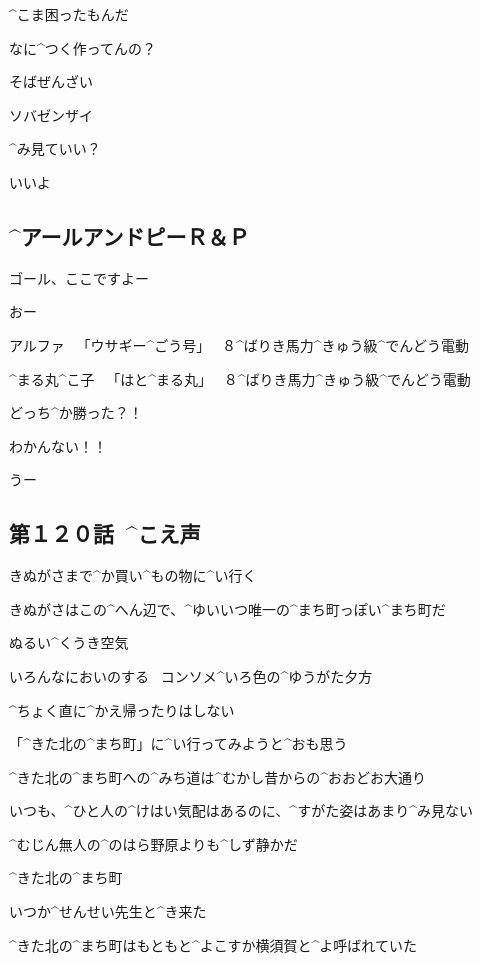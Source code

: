 \A ^{こま}{困}ったもんだ

\M なに^{つく}{作}ってんの？

\A そばぜんざい

\page
\M ソバゼンザイ

\M ^{み}{見}ていい？

\A いいよ


\subsection{^{アールアンドピー}{Ｒ＆Ｐ}}

\page[133]
\K ゴール、ここですよー

\A おー

\Sign アルファ
\ 「ウサギー^{ごう}{号}」
\ ８^{ばりき}{馬力}^{きゅう}{級}^{でんどう}{電動}

\Sign ^{まる}{丸}^{こ}{子}
\ 「はと^{まる}{丸}」
\ ８^{ばりき}{馬力}^{きゅう}{級}^{でんどう}{電動}

\page[136]
\R どっち^{か}{勝}った？！

\A わかんない！！

\K うー


\subsection{第１２０話\ ^{こえ}{声}}

\page[138]
\A きぬがさまで^{か}{買}い^{もの}{物}に^{い}{行}く

\A きぬがさはこの^{へん}{辺}で、^{ゆいいつ}{唯一}の^{まち}{町}っぽい^{まち}{町}だ

\page[140]
\A ぬるい^{くうき}{空気}

\A いろんなにおいのする
\ コンソメ^{いろ}{色}の^{ゆうがた}{夕方}

\A ^{ちょく}{直}に^{かえ}{帰}ったりはしない

\A 「^{きた}{北}の^{まち}{町}」に^{い}{行}ってみようと^{おも}{思}う

\page
\A ^{きた}{北}の^{まち}{町}への^{みち}{道}は^{むかし}{昔}からの^{おおどお}{大通}り

\A いつも、^{ひと}{人}の^{けはい}{気配}はあるのに、^{すがた}{姿}はあまり^{み}{見}ない

\A ^{むじん}{無人}の^{のはら}{野原}よりも^{しず}{静}かだ

\page[143]
\A ^{きた}{北}の^{まち}{町}

\A いつか^{せんせい}{先生}と^{き}{来}た

\page
\A ^{きた}{北}の^{まち}{町}はもともと^{よこすか}{横須賀}と^{よ}{呼}ばれていた

